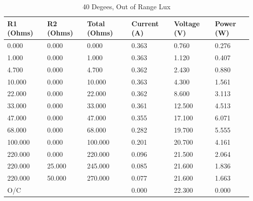 \documentclass{article}
\begin{document}
		\begin{table}[H]
			\centering
			\caption{40 Degees, Out of Range Lux}
			\begin{tabular}{|l|l|l|l|l|l|}
				\hline
				
				\textbf{R1 (Ohms)} & \textbf{R2 (Ohms)} & \textbf{Total (Ohms)} & \textbf{Current (A)} & \textbf{Voltage (V)} & \textbf{Power (W)} \\ \hline
				0.000 & 0.000 & 0.000 & 0.363 & 0.760 & 0.276 \\ \hline
				1.000 & 0.000 & 1.000 & 0.363 & 1.120 & 0.407 \\ \hline
				4.700 & 0.000 & 4.700 & 0.362 & 2.430 & 0.880 \\ \hline
				10.000 & 0.000 & 10.000 & 0.363 & 4.300 & 1.561 \\ \hline
				22.000 & 0.000 & 22.000 & 0.362 & 8.600 & 3.113 \\ \hline
				33.000 & 0.000 & 33.000 & 0.361 & 12.500 & 4.513 \\ \hline
				47.000 & 0.000 & 47.000 & 0.355 & 17.100 & 6.071 \\ \hline
				68.000 & 0.000 & 68.000 & 0.282 & 19.700 & 5.555 \\ \hline
				100.000 & 0.000 & 100.000 & 0.201 & 20.700 & 4.161 \\ \hline
				220.000 & 0.000 & 220.000 & 0.096 & 21.500 & 2.064 \\ \hline
				220.000 & 25.000 & 245.000 & 0.085 & 21.600 & 1.836 \\ \hline
				220.000 & 50.000 & 270.000 & 0.077 & 21.600 & 1.663 \\ \hline
				O/C & & & 0.000 & 22.300 & 0.000 \\ \hline
				
			\end{tabular}
		\end{table}
		
\end{document}
